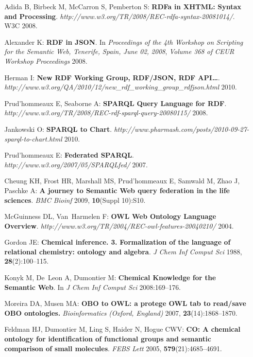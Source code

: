 \documentclass[10pt]{bmc_article}
\newenvironment{bmcformat}{\begin{raggedright}\baselineskip20pt\sloppy\setboolean{publ}{false}}{\end{raggedright}\baselineskip20pt\sloppy}
\begin{document}
\begin{bmcformat}
\begin{thebibliography}{10}
Adida B, Birbeck M, McCarron S, Pemberton S: \textbf{{RDFa} in {XHTML}: Syntax
  and Processing}. \emph{http://www.w3.org/TR/2008/REC-rdfa-syntax-20081014/}.
  W3C 2008.

Alexander K: \textbf{{RDF} in {JSON}}. In \emph{Proceedings of the 4th Workshop
  on Scripting for the Semantic Web, Tenerife, Spain, June 02, 2008},
  \emph{Volume 368 of \emph{CEUR Workshop Proceedings}} 2008.

Herman I: \textbf{New {RDF} Working Group, {RDF}/{JSON}, {RDF} {API}…}.
  \emph{http://www.w3.org/QA/2010/12/new\_rdf\_working\_group\_rdfjson.html}
  2010.

Prud'hommeaux E, Seaborne A: \textbf{{SPARQL} Query Language for {RDF}}.
  \emph{http://www.w3.org/TR/2008/REC-rdf-sparql-query-20080115/} 2008.

Jankowski O: \textbf{{SPARQL} to Chart}.
  \emph{http://www.pharmash.com/posts/2010-09-27-sparql-to-chart.html} 2010.

Prud'hommeaux E: \textbf{Federated {SPARQL}}.
  \emph{http://www.w3.org/2007/05/SPARQLfed/} 2007.

Cheung KH, Frost HR, Marshall MS, Prud'hommeaux E, Samwald M, Zhao J, Paschke
  A: \textbf{A journey to Semantic Web query federation in the life sciences}.
  \emph{BMC Bioinf} 2009, \textbf{10}(Suppl 10):S10.

McGuinness DL, Van~Harmelen F: \textbf{{OWL} Web Ontology Language Overview}.
  \emph{http://www.w3.org/TR/2004/REC-owl-features-20040210/} 2004.

Gordon JE: \textbf{Chemical inference. 3. Formalization of the language of
  relational chemistry: ontology and algebra}. \emph{J Chem Inf Comput Sci}
  1988, \textbf{28}(2):100--115.

Konyk M, De~Leon A, Dumontier M: \textbf{Chemical Knowledge for the Semantic
  Web}. In \emph{J Chem Inf Comput Sci} 2008:169--176.

Moreira DA, Musen MA: \textbf{{OBO} to {OWL}: a protege {OWL} tab to read/save
  {OBO} ontologies.} \emph{Bioinformatics (Oxford, England)} 2007,
  \textbf{23}(14):1868--1870.

Feldman HJ, Dumontier M, Ling S, Haider N, Hogue CWV: \textbf{{CO}: A chemical
  ontology for identification of functional groups and semantic comparison of
  small molecules}. \emph{FEBS Lett} 2005, \textbf{579}(21):4685--4691.


\end{thebibliography}
\end{bmcformat}
\end{document}
